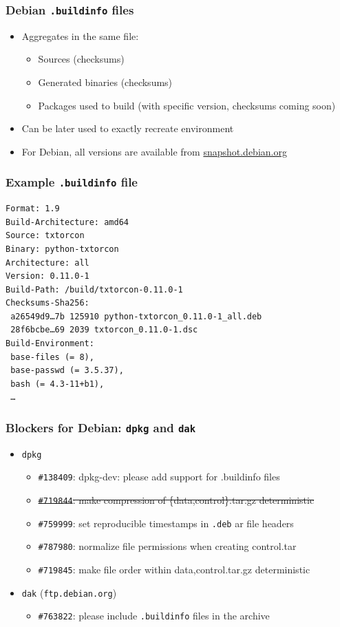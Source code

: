 \documentclass[14pt]{beamer}
\begin{document}
\begin{frame}
 \frametitle{Debian \texttt{.buildinfo} files}

 \begin{itemize}
  \item Aggregates in the same file:
   \begin{itemize}
    \item Sources (checksums)
    \item Generated binaries (checksums)
    \item Packages used to build (with specific version, checksums coming soon)
   \end{itemize}
  \item Can be later used to exactly recreate environment
  \item For Debian, all versions are available from \url{snapshot.debian.org}
 \end{itemize}
\end{frame}


\begin{frame}[fragile]
 \frametitle{Example \texttt{.buildinfo} file}

{\small
\begin{verbatim}
Format: 1.9
Build-Architecture: amd64
Source: txtorcon
Binary: python-txtorcon
Architecture: all
Version: 0.11.0-1
Build-Path: /build/txtorcon-0.11.0-1
Checksums-Sha256:
 a26549d9…7b 125910 python-txtorcon_0.11.0-1_all.deb
 28f6bcbe…69 2039 txtorcon_0.11.0-1.dsc
Build-Environment:
 base-files (= 8),
 base-passwd (= 3.5.37),
 bash (= 4.3-11+b1),
 …
\end{verbatim}
}
\end{frame}




\begin{frame}
 \frametitle{Blockers for Debian: \texttt{dpkg} and \texttt{dak}}
 \begin{itemize}
  \item \texttt{dpkg}
 \begin{itemize}
  \item \texttt{\#138409}: dpkg-dev: please add support for .buildinfo files
  \item \sout{\texttt{\#719844}: make compression of \{data,control\}.tar.gz deterministic}
  \item \texttt{\#759999}: set reproducible timestamps in \texttt{.deb} ar file headers
  \item \texttt{\#787980}: normalize file permissions when creating control.tar
  \item \texttt{\#719845}: make file order within {data,control}.tar.gz deterministic
 \end{itemize}
 \item \texttt{dak} (\texttt{ftp.debian.org})
 \begin{itemize}
  \item \texttt{\#763822}: please include \texttt{.buildinfo} files in the archive
 \end{itemize}
 \end{itemize}
\end{frame}
\end{document}
